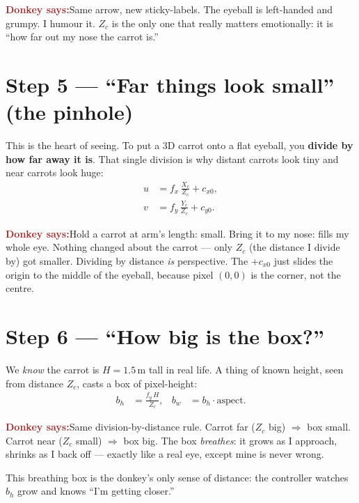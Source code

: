 \documentclass[11pt]{article}
\newcommand{\donkey}[1]{%
  \begin{mdframed}[backgroundcolor=brown!8, linecolor=brown!50, linewidth=1pt,
                   roundcorner=6pt, skipabove=8pt, skipbelow=8pt]
  \textbf{\textcolor{brown}{\large Donkey says:}}\quad #1
  \end{mdframed}}
\begin{document}
\donkey{Same arrow, new sticky-labels. The eyeball is left-handed and grumpy. I
humour it. $Z_c$ is the only one that really matters emotionally: it is ``how far
out my nose the carrot is.''}

\section{Step 5 --- ``Far things look small'' (the pinhole)}

This is the heart of seeing. To put a 3D carrot onto a flat eyeball, you
\textbf{divide by how far away it is}. That single division is why distant carrots
look tiny and near carrots look huge:
\begin{align}
u &= f_x\,\frac{X_c}{Z_c} + c_{x0}, \\
v &= f_y\,\frac{Y_c}{Z_c} + c_{y0}.
\end{align}

\donkey{Hold a carrot at arm's length: small. Bring it to my nose: fills my whole
eye. Nothing changed about the carrot --- only $Z_c$ (the distance I divide by)
got smaller. Dividing by distance \emph{is} perspective. The $+c_{x0}$ just slides
the origin to the middle of the eyeball, because pixel $(0,0)$ is the corner, not
the centre.}

\section{Step 6 --- ``How big is the box?''}

We \emph{know} the carrot is $H = 1.5$\,m tall in real life. A thing of known
height, seen from distance $Z_c$, casts a box of pixel-height:
\begin{align}
b_h &= \frac{f_y\,H}{Z_c}, & b_w &= b_h \cdot \text{aspect}.
\end{align}

\donkey{Same division-by-distance rule. Carrot far ($Z_c$ big) $\Rightarrow$ box
small. Carrot near ($Z_c$ small) $\Rightarrow$ box big. The box \emph{breathes}:
it grows as I approach, shrinks as I back off --- exactly like a real eye, except
mine is never wrong.}

This breathing box is the donkey's only sense of distance: the controller watches
$b_h$ grow and knows ``I'm getting closer.''

\end{document}
